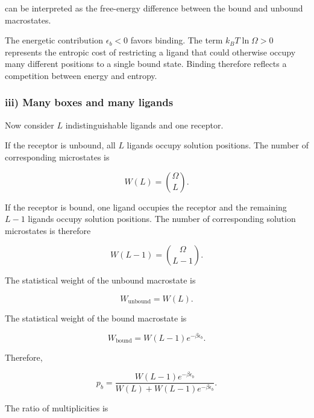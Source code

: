can be interpreted as the free-energy difference between the bound and unbound macrostates.

The energetic contribution $\epsilon_b<0$ favors binding.
The term $k_BT\ln\Omega>0$ represents the entropic cost of restricting a ligand that could otherwise occupy many different positions to a single bound state.
Binding therefore reflects a competition between energy and entropy.


\subsubsection*{iii) Many boxes and many ligands}

Now consider $L$ indistinguishable ligands and one receptor.

If the receptor is unbound, all $L$ ligands occupy solution positions.
The number of corresponding microstates is

\begin{equation}
    W(L)=\binom{\Omega}{L}.
\end{equation}

If the receptor is bound, one ligand occupies the receptor and the remaining $L-1$ ligands occupy solution positions.
The number of corresponding solution microstates is therefore

\begin{equation}
    W(L-1)=\binom{\Omega}{L-1}.
\end{equation}

The statistical weight of the unbound macrostate is

\begin{equation}
    W_{\mathrm{unbound}}=W(L).
\end{equation}

The statistical weight of the bound macrostate is

\begin{equation}
    W_{\mathrm{bound}}=W(L-1)e^{-\beta\epsilon_b}.
\end{equation}

Therefore,

\begin{equation}
    p_b=\frac{W(L-1)e^{-\beta\epsilon_b}}{W(L)+W(L-1)e^{-\beta\epsilon_b}}.
\end{equation}

The ratio of multiplicities is

